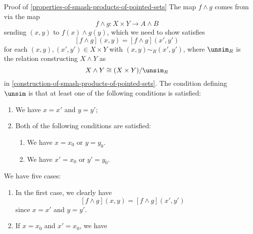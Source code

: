 \begin{Proof}{Proof of \cref{properties-of-smash-products-of-pointed-sets}}%
    The map $f\wedge g$ comes from  via the map
    \[
        f\wedge g%
        \colon%
        X\times Y%
        \to%
        A\wedge B%
    \]%
    sending $(x,y)$ to $f(x)\wedge g(y)$, which we need to show satisfies
    \[
        [f\wedge g](x,y)%
        =%
        [f\wedge g](x',y')%
    \]%
    for each $(x,y),(x',y')\in X\times Y$ with $(x,y)\sim_{R}(x',y')$, where $\unsim_{R}$ is the relation constructing $X\wedge Y$ as
    \[
        X\wedge Y%
        \cong%
        (X\times Y)/\unsim_{R}%
    \]%
    in \cref{construction-of-smash-products-of-pointed-sets}. The condition defining $\unsim$ is that at least one of the following conditions is satisfied:
    \begin{enumerate}
        \item\label{proof-of-properties-of-smash-products-of-pointed-sets-functoriality-1}We have $x=x'$ and $y=y'$;
        \item\label{proof-of-properties-of-smash-products-of-pointed-sets-functoriality-2}Both of the following conditions are satisfied:
            \begin{enumerate}
                \item\label{proof-of-properties-of-smash-products-of-pointed-sets-functoriality-2-a}We have $x=x_{0}$ or $y=y_{0}$.
                \item\label{proof-of-properties-of-smash-products-of-pointed-sets-functoriality-2-b}We have $x'=x_{0}$ or $y'=y_{0}$.
            \end{enumerate}
    \end{enumerate}
    We have five cases:
    \begin{enumerate}
        \item\label{proof-of-properties-of-smash-products-of-pointed-sets-functoriality-3}In the first case, we clearly have
            \[
                [f\wedge g](x,y)%
                =%
                [f\wedge g](x',y')%
            \]%
            since $x=x'$ and $y=y'$.
        \item\label{proof-of-properties-of-smash-products-of-pointed-sets-functoriality-4}If $x=x_{0}$ and $x'=x_{0}$, we have 

\end{enumerate}
\end{Proof}
